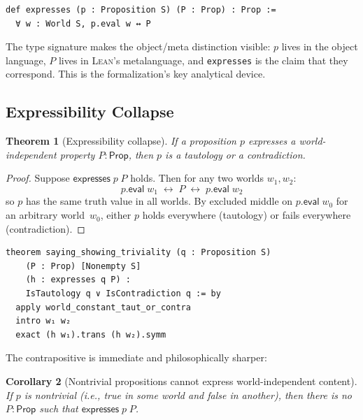 \documentclass[10pt, letterpaper]{article}
\newtheorem{theorem}{Theorem}[section]
\newtheorem{corollary}[theorem]{Corollary}
\theoremstyle{definition}
\theoremstyle{remark}
\newcommand{\Prop}{\mathsf{Prop}}
\newcommand{\eval}{\mathsf{eval}}
\newcommand{\expresses}{\mathsf{expresses}}
\newcommand{\Lean}{\textsc{Lean}}
\begin{document}
\begin{lstlisting}
def expresses (p : Proposition S) (P : Prop) : Prop :=
  ∀ w : World S, p.eval w ↔ P
\end{lstlisting}

\noindent
The type signature makes the object/meta distinction visible:
$p$ lives in the object language, $P$ lives in \Lean's
metalanguage, and \texttt{expresses} is the claim that they
correspond.  This is the formalization's key analytical device.

\subsection{Expressibility Collapse}
\label{sec:collapse}

\begin{theorem}[Expressibility collapse]
\label{thm:collapse}
If a proposition $p$ expresses a world-independent property
$P : \Prop$, then $p$ is a tautology or a contradiction.
\end{theorem}

\begin{proof}
Suppose $\expresses\;p\;P$ holds.  Then for any two worlds
$w_1, w_2$:
\[
  p.\eval\;w_1 \;\leftrightarrow\; P \;\leftrightarrow\;
  p.\eval\;w_2
\]
so $p$ has the same truth value in all worlds.  By excluded
middle on $p.\eval\;w_0$ for an arbitrary world~$w_0$, either
$p$ holds everywhere (tautology) or fails everywhere
(contradiction).
\end{proof}

\begin{lstlisting}
theorem saying_showing_triviality (q : Proposition S)
    (P : Prop) [Nonempty S]
    (h : expresses q P) :
    IsTautology q ∨ IsContradiction q := by
  apply world_constant_taut_or_contra
  intro w₁ w₂
  exact (h w₁).trans (h w₂).symm
\end{lstlisting}

\noindent
The contrapositive is immediate and philosophically sharper:

\begin{corollary}[Nontrivial propositions cannot express
world-independent content]
\label{cor:nontrivial}
If $p$ is nontrivial (i.e., true in some world and false in
another), then there is no $P : \Prop$ such that
$\expresses\;p\;P$.
\end{corollary}
\end{document}
